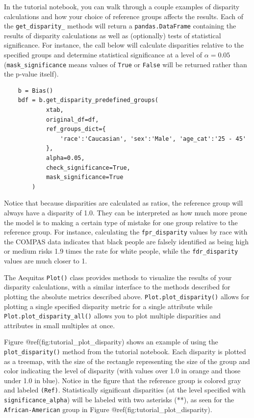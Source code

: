 \documentclass[]{krantz}
\begin{document}
In the tutorial notebook, you can walk through a couple examples of
disparity calculations and how your choice of reference groups affects
the results. Each of the \texttt{get\_disparity\_} methods will return a
\texttt{pandas.DataFrame} containing the results of disparity
calculations as well as (optionally) tests of statistical significance.
For instance, the call below will calculate disparities relative to the
specified groups and determine statistical significance at a level of
\(\alpha = 0.05\) (\texttt{mask\_significance} means values of
\texttt{True} or \texttt{False} will be returned rather than the p-value
itself).

\begin{verbatim}
    b = Bias()
    bdf = b.get_disparity_predefined_groups(
            xtab, 
            original_df=df, 
            ref_groups_dict={
                'race':'Caucasian', 'sex':'Male', 'age_cat':'25 - 45'
            }, 
            alpha=0.05, 
            check_significance=True, 
            mask_significance=True
        )
\end{verbatim}

Notice that because disparities are calculated as ratios, the reference
group will always have a disparity of 1.0. They can be interpreted as
how much more prone the model is to making a certain type of mistake for
one group relative to the reference group. For instance, calculating the
\texttt{fpr\_disparity} values by race with the COMPAS data indicates
that black people are falsely identified as being high or medium risks
1.9 times the rate for white people, while the \texttt{fdr\_disparity}
values are much closer to 1.

The Aequitas \texttt{Plot()} class provides methods to visualize the
results of your disparity calculations, with a similar interface to the
methods described for plotting the absolute metrics described above.
\texttt{Plot.plot\_disparity()} allows for plotting a single specified
disparity metric for a single attribute while
\texttt{Plot.plot\_disparity\_all()} allows you to plot multiple
disparities and attributes in small multiples at once.

Figure @ref(fig:tutorial\_plot\_disparity) shows an example of using the
\texttt{plot\_disparity()} method from the tutorial notebook. Each
disparity is plotted as a treemap, with the size of the rectangle
representing the size of the group and color indicating the level of
disparity (with values over 1.0 in orange and those under 1.0 in blue).
Notice in the figure that the reference group is colored gray and
labeled \texttt{(Ref)}. Statistically significant disparities (at the
level specified with \texttt{significance\_alpha}) will be labeled with
two asterisks (**), as seen for the \texttt{African-American} group in
Figure @ref(fig:tutorial\_plot\_disparity).
\end{document}
